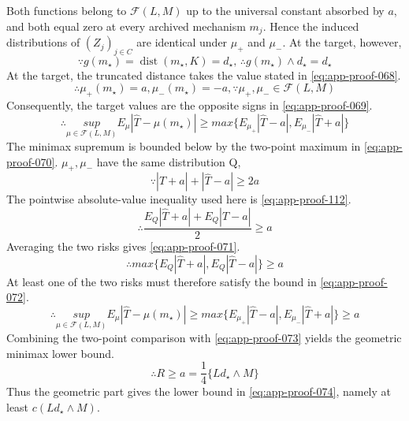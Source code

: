 \documentclass[11pt]{article}
\numberwithin{equation}{section}
\DeclareMathOperator{\dist}{dist}
\newcommand{\1}{\mathbf 1}
\newcommand{\cF}{\mathcal F}
\newcommand{\abs}[1]{\left\lvert #1\right\rvert}
\begin{document}
Both functions belong to \(\cF(L,M)\) up to the universal constant absorbed by \(a\), and both equal zero at every archived mechanism \(m_j\).  Hence the induced distributions of \((Z_j)_{j\in C}\) are identical under \(\mu_+\) and \(\mu_-\).  At the target, however,
\begin{equation}
\label{eq:app-proof-068}
\because g(m_\star)=\dist(m_\star,K)=d_\star,\,\therefore g(m_\star)\wedge d_\star=d_\star
\end{equation}
At the target, the truncated distance takes the value stated in
\eqref{eq:app-proof-068}.
\begin{equation}
\label{eq:app-proof-069}
\therefore \mu_+(m_\star)=a,\mu_-(m_\star)=-a,\because \mu_+,\mu_-\in\mathcal{F}(L,M)
\end{equation}
Consequently, the target values are the opposite signs in
\eqref{eq:app-proof-069}.
\begin{equation}
\label{eq:app-proof-070}
\therefore \underset{\mu\in\mathcal{F}(L,M)}{sup}E_\mu\abs{\widehat T-\mu(m_\star)}\ge max\{E_{\mu_+}\abs{\widehat T-a},E_{\mu_-}\abs{\widehat T+a}\}
\end{equation}
The minimax supremum is bounded below by the two-point maximum in
\eqref{eq:app-proof-070}.
\(\mu_+,\mu_-\) have the same distribution Q,
\begin{equation}
\label{eq:app-proof-112}
\because \abs{\widehat T+a}+\abs{\widehat T-a}\ge 2a
\end{equation}
The pointwise absolute-value inequality used here is
\eqref{eq:app-proof-112}.
\begin{equation}
\label{eq:app-proof-071}
\therefore \frac{E_Q\abs{\widehat T+a}+E_Q\abs{\widehat T-a}}2\ge a
\end{equation}
Averaging the two risks gives \eqref{eq:app-proof-071}.
\begin{equation}
\label{eq:app-proof-072}
\therefore max\{E_Q\abs{\widehat T+a},E_Q\abs{\widehat T-a}\}\ge a
\end{equation}
At least one of the two risks must therefore satisfy the bound in
\eqref{eq:app-proof-072}.
\begin{equation}
\label{eq:app-proof-073}
\therefore \underset{\mu\in\mathcal{F}(L,M)}{sup}E_\mu\abs{\widehat T-\mu(m_\star)}\ge max\{E_{\mu_+}\abs{\widehat T-a},E_{\mu_-}\abs{\widehat T+a}\}\ge a
\end{equation}
Combining the two-point comparison with \eqref{eq:app-proof-073} yields the
geometric minimax lower bound.
\begin{equation}
\label{eq:app-proof-074}
\therefore R\ge a=\frac14 \{Ld_\star\wedge M\}
\end{equation}
Thus the geometric part gives the lower bound in
\eqref{eq:app-proof-074}, namely at least \(c(Ld_\star\wedge M)\).
\end{document}
